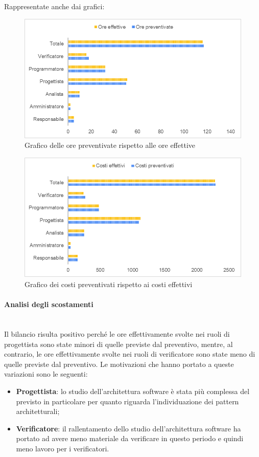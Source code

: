 Rappresentate anche dai grafici:
\begin{figure} [H]
	\includegraphics[width=\linewidth]{./img/Grafici/31.png}
	\caption{Grafico delle ore preventivate rispetto alle ore effettive}
\end{figure}

\begin{figure} [H]
	\includegraphics[width=\linewidth]{./img/Grafici/32.png}
	\caption{Grafico dei costi preventivati rispetto ai costi effettivi}
\end{figure}

\paragraph*{Analisi degli scostamenti} \mbox{} \\
Il bilancio risulta positivo perché le ore effettivamente svolte nei ruoli di progettista sono state minori di quelle previste dal preventivo, mentre, al contrario, le ore effettivamente svolte nei ruoli di verificatore sono state meno di quelle previste dal preventivo.
Le motivazioni che hanno portato a queste variazioni sono le seguenti:
\begin{itemize}
	\item \textbf{Progettista}: lo studio dell'architettura software è stata più complessa del previsto in particolare per quanto riguarda l'individuazione dei pattern architetturali;
	\item \textbf{Verificatore}: il rallentamento dello studio dell'architettura software ha portato ad avere meno materiale da verificare in questo periodo e quindi meno lavoro per i verificatori.
\end{itemize}

